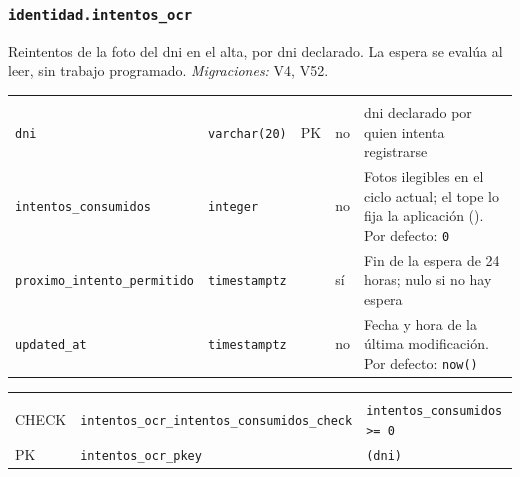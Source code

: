 \subsubsection{\texorpdfstring{\texttt{identidad.intentos\_\allowbreak{}ocr}}{identidad.intentos\_ocr}}\label{dd:identidad.intentos_ocr}

Reintentos de la foto del \gls{dni} en el alta, por \gls{dni} declarado. La espera se evalúa al leer, sin trabajo programado. \emph{Migraciones:} V4, V52.

{\small
\begin{xltabular}{\textwidth}{@{}>{\raggedright\arraybackslash}p{3.6cm} >{\raggedright\arraybackslash}p{2.3cm} >{\raggedright\arraybackslash}p{1cm} >{\centering\arraybackslash}p{0.85cm} L@{}}
    \toprule
     &  &  &  &  \\
    \midrule
    \endfirsthead
    \toprule
     &  &  &  &  \\
    \midrule
    \endhead
    \bottomrule
    \endfoot
    \texttt{dni} & \texttt{varchar(\allowbreak{}20)} & PK & no & \gls{dni} declarado por quien intenta registrarse \\
    \texttt{intentos\_\allowbreak{}consumidos} & \texttt{integer} &  & no & Fotos ilegibles en el ciclo actual; el tope lo fija la aplicación (). Por defecto: \texttt{0} \\
    \texttt{proximo\_\allowbreak{}intento\_\allowbreak{}permitido} & \texttt{timestamptz} &  & sí & Fin de la espera de 24 horas; nulo si no hay espera \\
    \texttt{updated\_\allowbreak{}at} & \texttt{timestamptz} &  & no & Fecha y hora de la última modificación. Por defecto: \texttt{now(\allowbreak{})} \\
\end{xltabular}
}

{\small
\begin{xltabular}{\textwidth}{@{}>{\raggedright\arraybackslash}p{1.7cm} >{\raggedright\arraybackslash}p{4.6cm} L@{}}
    \toprule
     &  &  \\
    \midrule
    \endfirsthead
    \toprule
     &  &  \\
    \midrule
    \endhead
    \bottomrule
    \endfoot
    CHECK & \texttt{intentos\_\allowbreak{}ocr\_\allowbreak{}intentos\_\allowbreak{}consumidos\_\allowbreak{}check} & \texttt{intentos\_\allowbreak{}consumidos \textgreater{}= 0} \\
    PK & \texttt{intentos\_\allowbreak{}ocr\_\allowbreak{}pkey} & \texttt{(\allowbreak{}dni)} \\
\end{xltabular}
}

